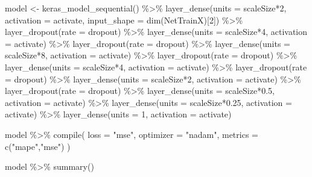 \documentclass[
]{article}
\newenvironment{Shaded}{\begin{snugshade}}{\end{snugshade}}
\newcommand{\AttributeTok}[1]{\textcolor[rgb]{0.77,0.63,0.00}{#1}}
\newcommand{\DecValTok}[1]{\textcolor[rgb]{0.00,0.00,0.81}{#1}}
\newcommand{\FloatTok}[1]{\textcolor[rgb]{0.00,0.00,0.81}{#1}}
\newcommand{\FunctionTok}[1]{\textcolor[rgb]{0.00,0.00,0.00}{#1}}
\newcommand{\NormalTok}[1]{#1}
\newcommand{\OtherTok}[1]{\textcolor[rgb]{0.56,0.35,0.01}{#1}}
\newcommand{\SpecialCharTok}[1]{\textcolor[rgb]{0.00,0.00,0.00}{#1}}
\newcommand{\StringTok}[1]{\textcolor[rgb]{0.31,0.60,0.02}{#1}}
\begin{document}
\begin{Shaded}
\begin{Highlighting}[]
\NormalTok{model }\OtherTok{\textless{}{-}} \FunctionTok{keras\_model\_sequential}\NormalTok{() }\SpecialCharTok{\%\textgreater{}\%}
  \FunctionTok{layer\_dense}\NormalTok{(}\AttributeTok{units =}\NormalTok{ scaleSize}\SpecialCharTok{*}\DecValTok{2}\NormalTok{, }\AttributeTok{activation =}\NormalTok{ activate, }\AttributeTok{input\_shape =} \FunctionTok{dim}\NormalTok{(NetTrainX)[}\DecValTok{2}\NormalTok{]) }\SpecialCharTok{\%\textgreater{}\%}
  \FunctionTok{layer\_dropout}\NormalTok{(}\AttributeTok{rate =}\NormalTok{ dropout) }\SpecialCharTok{\%\textgreater{}\%}
  \FunctionTok{layer\_dense}\NormalTok{(}\AttributeTok{units =}\NormalTok{ scaleSize}\SpecialCharTok{*}\DecValTok{4}\NormalTok{, }\AttributeTok{activation =}\NormalTok{ activate) }\SpecialCharTok{\%\textgreater{}\%}
  \FunctionTok{layer\_dropout}\NormalTok{(}\AttributeTok{rate =}\NormalTok{ dropout) }\SpecialCharTok{\%\textgreater{}\%}
  \FunctionTok{layer\_dense}\NormalTok{(}\AttributeTok{units =}\NormalTok{ scaleSize}\SpecialCharTok{*}\DecValTok{8}\NormalTok{, }\AttributeTok{activation =}\NormalTok{ activate) }\SpecialCharTok{\%\textgreater{}\%}
  \FunctionTok{layer\_dropout}\NormalTok{(}\AttributeTok{rate =}\NormalTok{ dropout) }\SpecialCharTok{\%\textgreater{}\%}
  \FunctionTok{layer\_dense}\NormalTok{(}\AttributeTok{units =}\NormalTok{ scaleSize}\SpecialCharTok{*}\DecValTok{4}\NormalTok{, }\AttributeTok{activation =}\NormalTok{ activate) }\SpecialCharTok{\%\textgreater{}\%}
  \FunctionTok{layer\_dropout}\NormalTok{(}\AttributeTok{rate =}\NormalTok{ dropout) }\SpecialCharTok{\%\textgreater{}\%}
  \FunctionTok{layer\_dense}\NormalTok{(}\AttributeTok{units =}\NormalTok{ scaleSize}\SpecialCharTok{*}\DecValTok{2}\NormalTok{, }\AttributeTok{activation =}\NormalTok{ activate) }\SpecialCharTok{\%\textgreater{}\%}
  \FunctionTok{layer\_dropout}\NormalTok{(}\AttributeTok{rate =}\NormalTok{ dropout) }\SpecialCharTok{\%\textgreater{}\%}
  \FunctionTok{layer\_dense}\NormalTok{(}\AttributeTok{units =}\NormalTok{ scaleSize}\SpecialCharTok{*}\FloatTok{0.5}\NormalTok{, }\AttributeTok{activation =}\NormalTok{ activate) }\SpecialCharTok{\%\textgreater{}\%}
  \FunctionTok{layer\_dense}\NormalTok{(}\AttributeTok{units =}\NormalTok{ scaleSize}\SpecialCharTok{*}\FloatTok{0.25}\NormalTok{, }\AttributeTok{activation =}\NormalTok{ activate) }\SpecialCharTok{\%\textgreater{}\%}
  \FunctionTok{layer\_dense}\NormalTok{(}\AttributeTok{units =} \DecValTok{1}\NormalTok{, }\AttributeTok{activation =}\NormalTok{ activate)}

\NormalTok{model }\SpecialCharTok{\%\textgreater{}\%} \FunctionTok{compile}\NormalTok{(}
   \AttributeTok{loss =} \StringTok{"mse"}\NormalTok{,}
   \AttributeTok{optimizer =}  \StringTok{"nadam"}\NormalTok{, }
   \AttributeTok{metrics =} \FunctionTok{c}\NormalTok{(}\StringTok{"mape"}\NormalTok{,}\StringTok{"mse"}\NormalTok{)}
\NormalTok{ )}
 
\NormalTok{model }\SpecialCharTok{\%\textgreater{}\%} \FunctionTok{summary}\NormalTok{()}
\end{Highlighting}
\end{Shaded}
\end{document}
